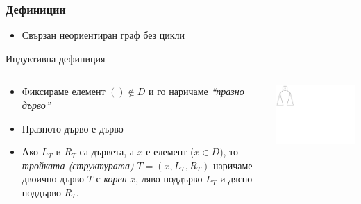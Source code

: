 \documentclass{beamer}
\begin{document}
\begin{frame}[fragile]
  \frametitle{Дефиниции}
  
      \begin{itemize}
        \item Свързан неориентиран граф без цикли
      \end{itemize}
  
      \vspace{1.5em}
       Индуктивна дефиниция
  
  \begin{columns}[t]
    \begin{column}{0.65\textwidth}
  
  
      \begin{itemize}
        \item Фиксираме елемент $() \notin D$ и го наричаме \emph{``празно дърво''}
        \item Празното дърво е дърво
        \item Ако $L_T$ и $R_T$ са дървета, а $x$ е елемент ($x \in D$), то \emph{тройката (структурата)} $T=(x,L_T,R_T)$ наричаме двоично дърво $T$ с \emph{корен} $x$, ляво поддърво $L_T$ и дясно поддърво $R_T$.
      \end{itemize}
  
    \end{column}
    \begin{column}{0.35\textwidth}
  
      \includegraphics[width=9cm]{images/tree_recursive}
  
    \end{column}
  \end{columns}
    
  \end{frame}
  
\end{document}

